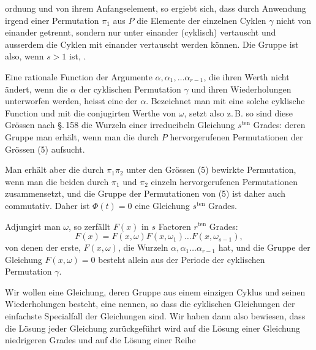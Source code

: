 ordnung und von ihrem Anfangselement, so ergiebt sich, dass durch Anwendung irgend einer Permutation $\pi_1$ aus $P$ die Elemente der einzelnen Cyklen $\gamma$ nicht von einander getrennt, sondern nur unter einander (cyklisch) vertauscht und ausserdem die Cyklen mit einander vertauscht werden können. Die Gruppe ist also, wenn $s>1$ ist, .

Eine rationale Function der Argumente $\alpha,\alpha_1,\ldots\alpha_{r-1}$, die ihren Werth nicht ändert, wenn die $\alpha$ der cyklischen Permutation $\gamma$ und ihren Wiederholungen unterworfen werden, heisst eine  der $\alpha$. Bezeichnet man mit
eine solche cyklische Function und mit
die conjugirten Werthe von $\omega$, setzt also z.\,B.
so sind diese Grössen nach \S.\,158 die Wurzeln einer irreducibeln Gleichung $s^{\text{ten}}$ Grades:
deren Gruppe man erhält, wenn man die durch $P$ hervorgerufenen Permutationen der Grössen (5) aufsucht.

Man erhält aber die durch $\pi_1\pi_2$ unter den Grössen (5) bewirkte Permutation, wenn man die beiden durch $\pi_1$ und $\pi_2$ einzeln hervorgerufenen Permutationen zusammensetzt, und die Gruppe der Permutationen von (5) ist daher auch commutativ. Daher ist $\Phi(t)=0$ eine  Gleichung $s^{\text{ten}}$ Grades.

Adjungirt man $\omega$, so zerfällt $F(x)$ in $s$ Factoren $r^{\text{ten}}$ Grades:
\[
F(x) = F(x,\omega)F(x,\omega_1)\ldots F(x,\omega_{s-1}),
\]
von denen der erste, $F(x,\omega)$, die Wurzeln $\alpha,\alpha_1\ldots\alpha_{r-1}$ hat, und die Gruppe der Gleichung $F(x,\omega)=0$ besteht allein aus der Periode der cyklischen Permutation $\gamma$.

Wir wollen eine Gleichung, deren Gruppe aus einem einzigen Cyklus und seinen Wiederholungen besteht, eine  nennen, so dass die cyklischen Gleichungen der einfachste Specialfall der  Gleichungen sind. Wir haben dann also bewiesen, dass die Lösung jeder  Gleichung zurückgeführt wird auf die Lösung einer  Gleichung niedrigeren Grades und auf die Lösung einer Reihe
